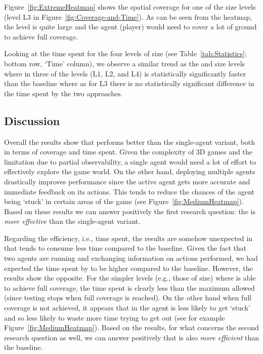 Figure~\ref{fig:ExtremeHeatmap} shows the spatial coverage for one of the \ext size levels (level L3 in Figure~\ref{fig:Coverage-and-Time}). As can be seen from the heatmap, the level is quite large and the agent (player) would need to cover a lot of ground to achieve full coverage.

\begin{figure*}[!htb]
	\hspace*{\fill}%
	\hfill%
	\hspace*{\fill}%
	\caption{Spatial coverage for level L3 of \ext size. The darker the color the less explored the area.}
	\label{fig:ExtremeHeatmap}
\end{figure*}
Looking at the time spent for the four levels of \ext size (see Table~\ref{tab:Statistics}; bottom row, `Time' column), we observe a similar trend as the \med and \lrg size levels where in three of the levels (L1, L2, and L4) \approach is statistically significantly faster than the baseline where as for L3 there is no statistically significant difference in the time spent by the two approaches. 

\subsection{Discussion}
Overall the results show that \approach performs better than the single-agent variant, both in terms of coverage and time spent. Given the complexity of 3D games and the limitation due to partial observability, a single agent would need a lot of effort to effectively explore the game world. On the other hand, deploying multiple agents drastically improves performance since the active agent gets more accurate and immediate feedback on its actions. This tends to reduce the chances of the agent being `stuck' in certain areas of the game (see Figure~\ref{fig:MediumHeatmap}). Based on these results we can answer positively the first research question:
the \approach is \emph{more effective} than the single-agent variant.

Regarding the efficiency, i.e., time spent, the results are somehow unexpected in that \approach tends to consume less time compared to the baseline. Given the fact that two agents are running and exchanging information on actions performed, we had expected the time spent by \approach to be higher compared to the baseline. However, the results show the opposite. For the simpler levels (e.g., those of \med size) where \approach is able to achieve full coverage, the time spent is clearly less than the maximum allowed (since testing stops when full coverage is reached). On the other hand when full coverage is not achieved, it appears that in \approach the agent is less likely to get `stuck' and so less likely to waste more time trying to get out (see for example Figure~\ref{fig:MediumHeatmap}). Based on the results, for what concerns the second research question as well, we can answer positively that \approach is also \emph{more efficient} than the baseline.
